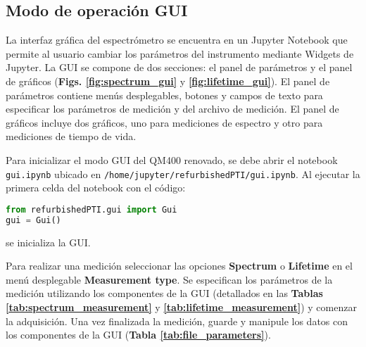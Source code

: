 \subsection{Modo de operación GUI}

La interfaz gráfica del espectrómetro se encuentra en un Jupyter Notebook que permite al usuario cambiar los parámetros del instrumento mediante Widgets de Jupyter.  
La GUI se compone de dos secciones: el panel de parámetros y el panel de gráficos (\textbf{Figs. \ref{fig:spectrum_gui}} y \textbf{\ref{fig:lifetime_gui}}).  
El panel de parámetros contiene menús desplegables, botones y campos de texto para especificar los parámetros de medición y del archivo de medición.  
El panel de gráficos incluye dos gráficos, uno para mediciones de espectro y otro para mediciones de tiempo de vida.  

Para inicializar el modo GUI del QM400 renovado, se debe abrir el notebook \texttt{gui.ipynb} ubicado en \texttt{/home/jupyter/refurbishedPTI/gui.ipynb}.  
Al ejecutar la primera celda del notebook con el código:

\begin{lstlisting}[language=Python]
from refurbishedPTI.gui import Gui
gui = Gui()
\end{lstlisting}

\noindent se inicializa la GUI. 

Para realizar una medición seleccionar las opciones \textbf{Spectrum} o \textbf{Lifetime} en el menú desplegable \textbf{Measurement type}.  
Se especifican los parámetros de la medición utilizando los componentes de la GUI (detallados en las \textbf{Tablas \ref{tab:spectrum_measurement}} y \textbf{\ref{tab:lifetime_measurement}}) y comenzar la adquisición.  
Una vez finalizada la medición, guarde y manipule los datos con los componentes de la GUI (\textbf{Tabla \ref{tab:file_parameters}}).

